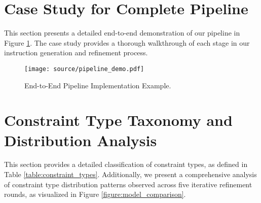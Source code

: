 \section{Case Study for Complete Pipeline }
\label{appendix:pipeline_case}

This section presents a detailed end-to-end demonstration of our pipeline in Figure \ref{figure:pipeline_case}. The case study provides a thorough walkthrough of each stage in our instruction generation and refinement process.


\begin{figure}[h]
\centering
\texttt{[image: source/pipeline\_demo.pdf]}
\caption{End-to-End Pipeline Implementation Example.}
\label{figure:pipeline_case}
\end{figure}





\section{Constraint Type Taxonomy and Distribution Analysis}
\label{appendix:constraints_type}

This section provides a detailed classification of constraint types, as defined in Table \ref{table:constraint_types}. Additionally, we present a comprehensive analysis of constraint type distribution patterns observed across five iterative refinement rounds, as visualized in Figure \ref{figure:model_comparison}.

